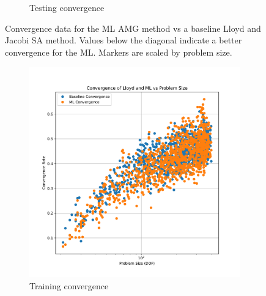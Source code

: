 \documentclass{article}
\begin{document}
\begin{figure}[h]
\begin{subfigure}[t]{0.49\textwidth}
    \caption{Testing convergence}
  \end{subfigure}
  \caption{Convergence data for the ML AMG method vs a baseline Lloyd and Jacobi SA method.  Values below the diagonal indicate a better convergence for the ML.  Markers are scaled by problem size.}
  \label{fig:conv}
\end{figure}

\begin{figure}[h]
  \centering
  \begin{subfigure}[t]{0.49\textwidth}
    \centering
    \includegraphics[width=\textwidth]{iso_train_convergence_per_size.pdf}
    \caption{Training convergence}
  \end{subfigure}
  \begin{subfigure}[t]{0.49\textwidth}
    \centering

\end{subfigure}
\end{figure}
\end{document}
